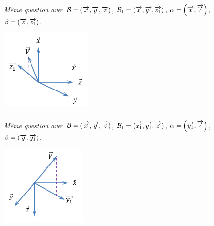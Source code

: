 \documentclass[11pt,oneside]{article}
\begin{document}
\begin{minipage}[c]{.7\linewidth}
\subparagraph{}
\textit{Même question avec $\mathcal{B}=(\overrightarrow{x},\overrightarrow{y},\overrightarrow{z})$, $\mathcal{B}_1=(\overrightarrow{x},\overrightarrow{y_1},\overrightarrow{z_1})$,  $\alpha=\left(\overrightarrow{x},\overrightarrow{V}\right)$, $\beta=\left(\overrightarrow{z},\overrightarrow{z_1} \right)$.}
\end{minipage} \hfill
\begin{minipage}[c]{.29\linewidth}
\begin{center}
\includegraphics[height=4cm]{png/exo4_5}
\end{center}
\end{minipage}



\begin{minipage}[c]{.7\linewidth}
\subparagraph{}
\textit{Même question avec $\mathcal{B}=(\overrightarrow{x},\overrightarrow{y},\overrightarrow{z})$, $\mathcal{B}_1=(\overrightarrow{x_1},\overrightarrow{y_1},\overrightarrow{z})$,  $\alpha=\left(\overrightarrow{y_1},\overrightarrow{V}\right)$, $\beta=\left(\overrightarrow{y},\overrightarrow{y_1} \right)$.}
\end{minipage} \hfill
\begin{minipage}[c]{.29\linewidth}
\begin{center}
\includegraphics[height=4cm]{png/exo4_6}
\end{center}
\end{minipage}

\end{document}
